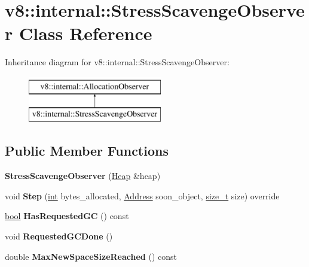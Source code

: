 \hypertarget{classv8_1_1internal_1_1StressScavengeObserver}{}\section{v8\+:\+:internal\+:\+:Stress\+Scavenge\+Observer Class Reference}
\label{classv8_1_1internal_1_1StressScavengeObserver}
Inheritance diagram for v8\+:\+:internal\+:\+:Stress\+Scavenge\+Observer\+:\begin{figure}[H]
\begin{center}
\leavevmode
\includegraphics[height=2.000000cm]{classv8_1_1internal_1_1StressScavengeObserver}
\end{center}
\end{figure}
\subsection*{Public Member Functions}
\begin{DoxyCompactItemize}
\item 
\mbox{\label{classv8_1_1internal_1_1StressScavengeObserver_a0aa8e14d637cafd22012dfc77f74390a}} 
{\bfseries Stress\+Scavenge\+Observer} (\mbox{\hyperlink{classv8_1_1internal_1_1Heap}{Heap}} \&heap)
\item 
\mbox{\label{classv8_1_1internal_1_1StressScavengeObserver_ad0c0b09c5d47a0cb6db48ef5e161a63c}} 
void {\bfseries Step} (\mbox{\hyperlink{classint}{int}} bytes\+\_\+allocated, \mbox{\hyperlink{classuintptr__t}{Address}} soon\+\_\+object, \mbox{\hyperlink{classsize__t}{size\+\_\+t}} size) override
\item 
\mbox{\label{classv8_1_1internal_1_1StressScavengeObserver_af0edd8b367e3beeba1474eed072930b0}} 
\mbox{\hyperlink{classbool}{bool}} {\bfseries Has\+Requested\+GC} () const
\item 
\mbox{\label{classv8_1_1internal_1_1StressScavengeObserver_a0471e95231c48af47db54f22648a8f47}} 
void {\bfseries Requested\+G\+C\+Done} ()
\item 
\mbox{\label{classv8_1_1internal_1_1StressScavengeObserver_a3e21094033a94ec1b476ef2b94ca298d}} 
double {\bfseries Max\+New\+Space\+Size\+Reached} () const
\end{DoxyCompactItemize}

